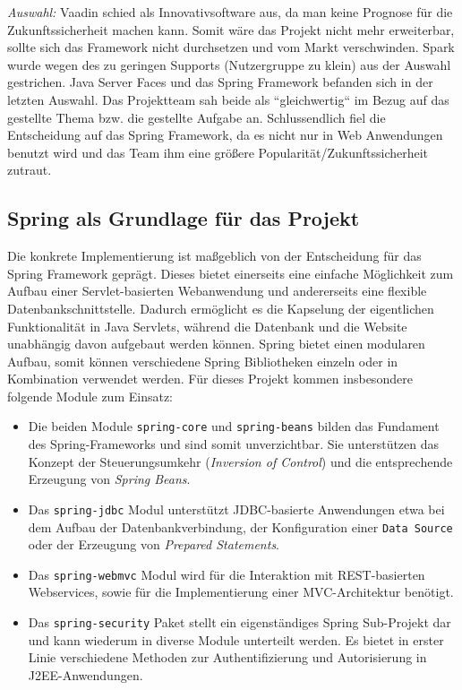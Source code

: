 \textit{Auswahl:} Vaadin schied als Innovativsoftware aus, da man keine Prognose für die Zukunftssicherheit machen kann. Somit wäre das Projekt nicht mehr erweiterbar, sollte sich das Framework nicht durchsetzen und vom Markt verschwinden. Spark wurde wegen des zu geringen Supports (Nutzergruppe zu klein) aus der Auswahl gestrichen. Java Server Faces und das Spring Framework befanden sich in der letzten Auswahl. Das Projektteam sah beide als “gleichwertig“ im Bezug auf das gestellte Thema bzw. die gestellte Aufgabe an. Schlussendlich fiel die Entscheidung auf das Spring Framework, da es nicht nur in Web Anwendungen benutzt wird und das Team ihm eine größere Popularität/Zukunftssicherheit zutraut.

\subsection{Spring als Grundlage für das Projekt}

Die konkrete Implementierung ist maßgeblich von der Entscheidung für das Spring Framework
geprägt. Dieses bietet einerseits eine einfache Möglichkeit zum Aufbau einer Servlet-basierten
Webanwendung und andererseits eine flexible Datenbank­schnittstelle. Dadurch ermöglicht es
die Kapselung der eigentlichen Funktionalität in Java Servlets, während die Datenbank und die
Website unabhängig davon aufgebaut werden können. Spring bietet einen modularen Aufbau, somit können
verschiedene Spring Bibliotheken einzeln oder in Kombination verwendet werden. Für dieses Projekt kommen
insbesondere folgende Module zum Einsatz: \\
\begin{itemize}
	\item Die beiden Module \texttt{spring-core} und \texttt{spring-beans} bilden das Fundament des Spring-Frameworks und sind somit unverzichtbar. Sie unterstützen das Konzept der Steuerungsumkehr (\textit{Inversion of Control}) und die entsprechende Erzeugung von \textit{Spring Beans}.
	\item Das \texttt{spring-jdbc} Modul unterstützt JDBC-basierte Anwendungen etwa bei dem Aufbau der Datenbankverbindung, der Konfiguration einer \texttt{Data Source} oder der Erzeugung von \textit{Prepared Statements}.
	\item Das \texttt{spring-webmvc} Modul wird für die Interaktion mit REST-basierten Webservices, sowie für die Implementierung einer \acs{MVC}-Architektur benötigt.
	\item Das \texttt{spring-security} Paket stellt ein eigenständiges Spring Sub-Projekt dar und kann wiederum in diverse Module unterteilt werden. Es bietet in erster Linie verschiedene Methoden zur Authentifizierung und Autorisierung in J2EE-Anwendungen.
\end{itemize}

